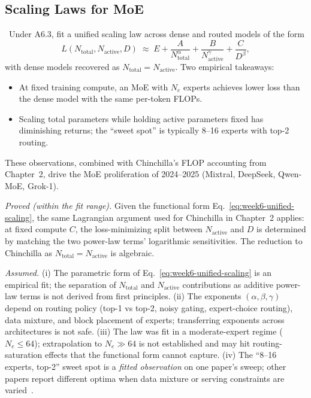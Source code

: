 \subsection{Scaling Laws for MoE}

\Emp\ Under A6.3, \citet{clark2022unified} fit a unified scaling law
across dense and routed models of the form
\begin{equation}
\label{eq:week6-unified-scaling}
L(N_{\mathrm{total}}, N_{\mathrm{active}}, D) \;\approx\;
  E + \frac{A}{N_{\mathrm{total}}^\alpha} +
      \frac{B}{N_{\mathrm{active}}^\gamma} +
      \frac{C}{D^\beta},
\end{equation}
with dense models recovered as $N_{\mathrm{total}} = N_{\mathrm{active}}$.
Two empirical takeaways:
\begin{itemize}
  \item At fixed training compute, an MoE with $N_e$ experts achieves
        lower loss than the dense model with the same per-token
        FLOPs.
  \item Scaling total parameters while holding active parameters
        fixed has diminishing returns; the ``sweet spot'' is
        typically 8--16 experts with top-2 routing.
\end{itemize}
These observations, combined with Chinchilla's FLOP accounting from
Chapter~2, drive the MoE proliferation of 2024--2025 (Mixtral, DeepSeek,
Qwen-MoE, Grok-1).

\begin{provedassumed}
\emph{Proved (within the fit range).}
Given the functional form Eq.~\eqref{eq:week6-unified-scaling}, the
same Lagrangian argument used for Chinchilla in Chapter~2 applies: at
fixed compute $C$, the loss-minimizing split between
$N_{\mathrm{active}}$ and $D$ is determined by matching the two
power-law terms' logarithmic sensitivities. The reduction to
Chinchilla as $N_{\mathrm{total}} = N_{\mathrm{active}}$ is algebraic.

\emph{Assumed.}
(i) The parametric form of Eq.~\eqref{eq:week6-unified-scaling} is
an empirical fit; the separation of $N_{\mathrm{total}}$ and
$N_{\mathrm{active}}$ contributions as additive power-law terms is
not derived from first principles.
(ii) The exponents $(\alpha, \beta, \gamma)$ depend on routing
policy (top-1 vs top-2, noisy gating, expert-choice routing), data
mixture, and block placement of experts; transferring exponents
across architectures is not safe.
(iii) The law was fit in a moderate-expert regime ($N_e \le 64$);
extrapolation to $N_e \gg 64$ is not established and may hit
routing-saturation effects that the functional form cannot capture.
(iv) The ``8--16 experts, top-2'' sweet spot is a \emph{fitted
observation} on one paper's sweep; other papers report
different optima when data mixture or serving constraints are
varied~\citep{fedus2021switch,jiang2024mixtral}.
\end{provedassumed}

